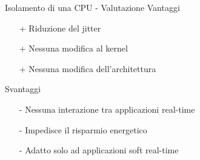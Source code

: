 \begin{frame}{Isolamento di una CPU - Valutazione}
	Vantaggi
	\begin{itemize}
		\item[+] Riduzione del jitter
		\item[+] Nessuna modifica al kernel
		\item[+] Nessuna modifica dell'architettura
	\end{itemize}
	\vspace{20px}
	Svantaggi
	\begin{itemize}
		\item[-] Nessuna interazione tra applicazioni real-time
		\item[-] Impedisce il risparmio energetico
		\item[-] Adatto solo ad applicazioni soft real-time
	\end{itemize}
\end{frame}